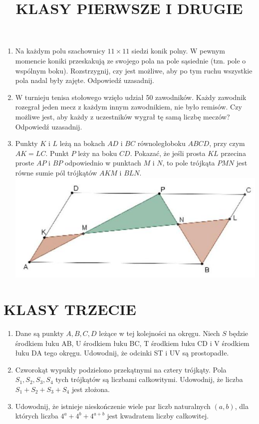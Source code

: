 \documentclass[10pt]{article}
\title{KLASY PIERWSZE I DRUGIE }
\author{}
\date{}
\begin{document}
\maketitle
\begin{enumerate}
  \item Na każdym polu szachownicy \(11 \times 11\) siedzi konik polny. W pewnym momencie koniki przeskakują ze swojego pola na pole sąsiednie (tzn. pole o wspólnym boku). Rozstrzygnij, czy jest możliwe, aby po tym ruchu wszystkie pola nadal były zajęte. Odpowiedź uzasadnij.
  \item W turnieju tenisa stołowego wzięło udział 50 zawodników. Każdy zawodnik rozegrał jeden mecz z każdym innym zawodnikiem, nie było remisów. Czy możliwe jest, aby każdy z uczestników wygrał tę samą liczbę meczów? Odpowiedź uzasadnij.
  \item Punkty \(K\) i \(L\) leżą na bokach \(A D\) i \(B C\) równoległoboku \(A B C D\), przy czym \(A K=L C\). Punkt \(P\) leży na boku \(C D\). Pokazać, że jeśli prosta \(K L\) przecina proste \(A P\) i \(B P\) odpowiednio w punktach \(M\) i \(N\), to pole trójkąta \(P M N\) jest równe sumie pól trójkątów \(A K M\) i \(B L N\).\\
\includegraphics[max width=\textwidth, center]{2024_11_21_b72d51b763316a99ebb1g-1}
\end{enumerate}

\section*{KLASY TRZECIE}
\begin{enumerate}
  \item Dane są punkty \(A, B, C, D\) leżące w tej kolejności na okręgu. Niech \(S\) będzie środkiem łuku AB, U środkiem łuku BC, T środkiem łuku CD i V środkiem łuku DA tego okręgu. Udowodnij, że odcinki ST i UV są prostopadłe.
  \item Czworokąt wypukły podzielono przekątnymi na cztery trójkąty. Pola \(S_{1}, S_{2}, S_{3}, S_{4}\) tych trójkątów są liczbami całkowitymi. Udowodnij, że liczba \(S_{1}+S_{2}+S_{3}+S_{4}\) jest złożona.
  \item Udowodnij, że istnieje nieskończenie wiele par liczb naturalnych \((a, b)\), dla których liczba \(4^{a}+4^{b}+4^{a+b}\) jest kwadratem liczby całkowitej.
\end{enumerate}
\end{document}
